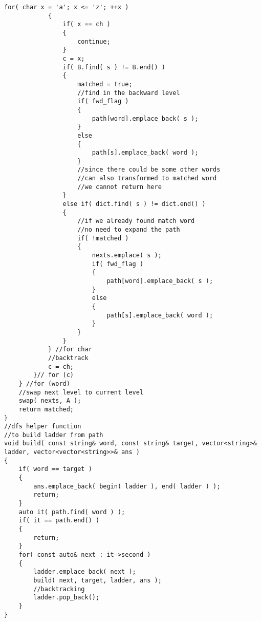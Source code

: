 \begin{lstlisting}[style=customc, caption={Two Directional BFS}]
            for( char x = 'a'; x <= 'z'; ++x )
            {
                if( x == ch )
                {
                    continue;
                }
                c = x;
                if( B.find( s ) != B.end() )
                {
                    matched = true;
                    //find in the backward level
                    if( fwd_flag )
                    {
                        path[word].emplace_back( s );
                    }
                    else
                    {
                        path[s].emplace_back( word );
                    }
                    //since there could be some other words
                    //can also transformed to matched word
                    //we cannot return here
                }
                else if( dict.find( s ) != dict.end() )
                {
                    //if we already found match word
                    //no need to expand the path
                    if( !matched )
                    {
                        nexts.emplace( s );
                        if( fwd_flag )
                        {
                            path[word].emplace_back( s );
                        }
                        else
                        {
                            path[s].emplace_back( word );
                        }
                    }
                }
            } //for char
            //backtrack
            c = ch;
        }// for (c)
    } //for (word)
    //swap next level to current level
    swap( nexts, A );
    return matched;
}
//dfs helper function
//to build ladder from path
void build( const string& word, const string& target, vector<string>& ladder, vector<vector<string>>& ans )
{
    if( word == target )
    {
        ans.emplace_back( begin( ladder ), end( ladder ) );
        return;
    }
    auto it( path.find( word ) );
    if( it == path.end() )
    {
        return;
    }
    for( const auto& next : it->second )
    {
        ladder.emplace_back( next );
        build( next, target, ladder, ans );
        //backtracking
        ladder.pop_back();
    }
}
\end{lstlisting}